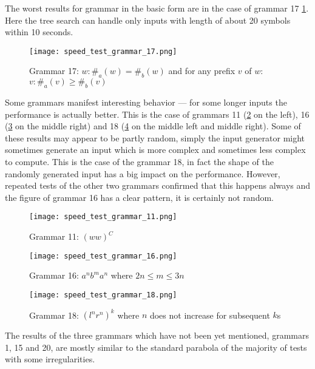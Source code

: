 The worst results for grammar in the basic form are in the case of grammar 17 \ref{fig:speed_test_grammar_17}. Here the tree search can handle only inputs with length of about 20 symbols within 10 seconds.

\begin{figure}[h!]
  \texttt{[image: speed\_test\_grammar\_17.png]}
  \caption{Grammar 17: $w: \#_a(w) = \#_b(w)$ and for any prefix $v$ of $w$: $v: \#_a(v) \geq \#_b(v)$}
  \label{fig:speed_test_grammar_17}
\end{figure}

Some grammars manifest interesting behavior --- for some longer inputs the performance is actually better. This is the case of grammars 11 (\ref{fig:speed_test_grammar_11} on the left), 16 (\ref{fig:speed_test_grammar_16} on the middle right) and 18 (\ref{fig:speed_test_grammar_18} on the middle left and middle right). Some of these results may appear to be partly random, simply the input generator might sometimes generate an input which is more complex and sometimes less complex to compute. This is the case of the grammar 18, in fact the shape of the randomly generated input has a big impact on the performance. However, repeated tests of the other two grammars confirmed that this happens always and the figure of grammar 16 has a clear pattern, it is certainly not random.

\begin{figure}[h!]
  \texttt{[image: speed\_test\_grammar\_11.png]}
  \caption{Grammar 11: $(ww)^C$}
  \label{fig:speed_test_grammar_11}
\end{figure}

\begin{figure}[h!]
  \texttt{[image: speed\_test\_grammar\_16.png]}
  \caption{Grammar 16: $a^n b^m a^n$ where $2n \leq m \leq 3n$}
  \label{fig:speed_test_grammar_16}
\end{figure}

\begin{figure}[h!]
  \texttt{[image: speed\_test\_grammar\_18.png]}
  \caption{Grammar 18: $(l^n r^n)^k$ where $n$ does not increase for subsequent $k$s}
  \label{fig:speed_test_grammar_18}
\end{figure}

The results of the three grammars which have not been yet mentioned, grammars 1, 15 and 20, are mostly similar to the standard parabola of the majority of tests with some irregularities.

